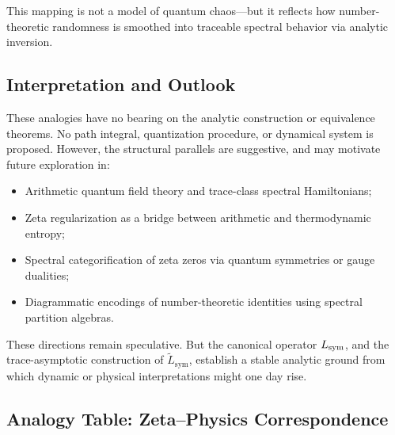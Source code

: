 This mapping is not a model of quantum chaos—but it reflects how number-theoretic randomness is smoothed into traceable spectral behavior via analytic inversion.

\subsection*{Interpretation and Outlook}

These analogies have no bearing on the analytic construction or equivalence theorems. No path integral, quantization procedure, or dynamical system is proposed. However, the structural parallels are suggestive, and may motivate future exploration in:

\begin{itemize}
  \item Arithmetic quantum field theory and trace-class spectral Hamiltonians;
  \item Zeta regularization as a bridge between arithmetic and thermodynamic entropy;
  \item Spectral categorification of zeta zeros via quantum symmetries or gauge dualities;
  \item Diagrammatic encodings of number-theoretic identities using spectral partition algebras.
\end{itemize}

These directions remain speculative. But the canonical operator \( L_{\mathrm{sym}} \), and the trace-asymptotic construction of \( \tilde{L}_{\mathrm{sym}} \), establish a stable analytic ground from which dynamic or physical interpretations might one day rise.

\subsection*{Analogy Table: Zeta–Physics Correspondence}

